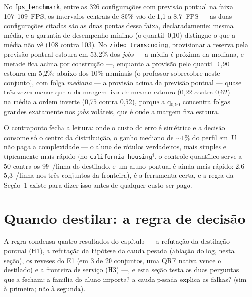 No \texttt{fps\_\allowbreak benchmark}, entre as 326 configurações com
previsão pontual na faixa 107--109~FPS, os intervalos centrais de
80\% vão de 1,1 a 8,7~FPS --- as duas configurações citadas são as duas pontas
dessa faixa, declaradamente: mesma média, e a garantia de
desempenho mínimo (o quantil~0,10) distingue o que a média não vê
(108 contra 103). No
\texttt{video\_\allowbreak transcoding}, provisionar a reserva pela
previsão pontual estoura em 53,2\% dos \emph{jobs} --- a média é
próxima da mediana, e metade fica acima por construção ---, enquanto a
provisão pelo quantil~0,90 estoura em 5,2\%: abaixo dos 10\% nominais
(o professor sobrecobre neste conjunto), com folga \emph{mediana}
--- a provisão acima da previsão pontual --- quase
três vezes menor que a da margem fixa de mesmo estouro (0,22 contra
0,62) --- na média a ordem inverte (0,76 contra 0,62), porque a
q$_{0,90}$ concentra folgas grandes exatamente nos \emph{jobs}
voláteis, que é onde a margem fixa estoura.

O contraponto fecha a leitura: onde o custo do erro é
simétrico e a decisão consome só o centro da distribuição, o ganho
mediano de ${\sim}1\%$ do perfil em~U não paga a complexidade --- o
aluno de rótulos verdadeiros, mais simples e tipicamente mais rápido
(no
\texttt{california\_\allowbreak housing}$^\dagger$, o controle
quantílico serve a 50 contra os 99~\us/linha do destilado, e um
aluno pontual é ainda mais rápido: 2,6--5,3~\us/linha nos três
conjuntos da fronteira), é a
ferramenta certa, e a regra da Seção~\ref{sec:destil-regra} existe
para dizer isso antes de qualquer custo ser pago.

\section{Quando destilar: a regra de decisão}
\label{sec:destil-regra}

A regra condensa quatro resultados do capítulo --- a refutação da
destilação pontual (H1), a refutação da hipótese da cauda pesada
(ablação do log, nesta seção), os reveses do E1 (em 3 de 20
conjuntos, uma QRF nativa vence o destilado) e a fronteira de
serviço (H3) ---, e esta seção testa as duas perguntas que a fecham:
a família do aluno importa? a cauda pesada explica as falhas? (sim à
primeira; não à segunda).

